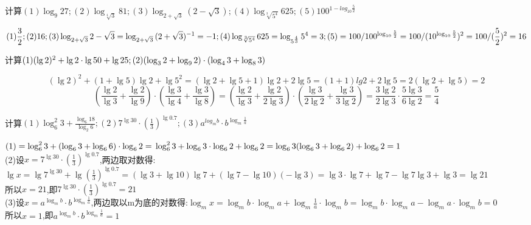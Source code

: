 \begin{problem}
    计算$\displaystyle (1)\log_9{27};(2)\log_{\sqrt[4]{3}}{81};
    (3)\log_{2+\sqrt{3}}{(2-\sqrt{3})};(4)\log_{\sqrt[3]{5^4}}{625};(5)100^{1-log_{10}{\frac{5}{2}}}$
    \begin{jiexi}
            $\displaystyle (1)\frac{3}{2};(2)16;(3)\log_{2+\sqrt{3}}{2-\sqrt{3}}=\log_{2+\sqrt{3}}{(2+\sqrt{3})^{-1}}=-1;
            \\ (4)\log_{\sqrt[3]{5^4}}{625}=\log_{5^{\frac{4}{3}}}{5^4}=3;
            (5)=100 / 100^{\log_{10}{\frac{5}{2}}}=100 / (10^{\log_{10}{\frac{5}{2}}})^2=100/(\frac{5}{2})^2=16$
    \end{jiexi}
\end{problem}

\begin{problem}
    计算$(1)(\lg2)^2+\lg2\cdot\lg{50}+\lg{25};\\
    (2)(\log_3{2}+\log_9{2})\cdot(\log_4{3}+\log_8{3})$
    \begin{jiexi}
        $$(\lg2)^2+(1+\lg5)\lg2+\lg{5^2}=(\lg2+\lg5+1)\lg2+2\lg5=(1+1)lg2+2\lg5=2(\lg2+\lg5) = 2$$
        $$(\frac{\lg2}{\lg3}+\frac{\lg2}{\lg9})\cdot(\frac{\lg3}{\lg4}+\frac{\lg3}{\lg8})=
        (\frac{\lg2}{\lg3}+\frac{\lg2}{2\lg3})\cdot(\frac{\lg3}{2\lg2}+\frac{\lg3}{3\lg2})=\frac{3\lg2}{2\lg3}\cdot\frac{5\lg3}{6\lg2}=\frac{5}{4}$$
    \end{jiexi}
\end{problem}

\begin{problem}
    计算$\displaystyle (1)\log_6^2{3}+\frac{\log_6{18}}{\log_2{6}};
    (2)7^{\lg{30}}\cdot (\frac{1}{3})^{\lg{0.7}};
    (3)a^{log_m{b}}\cdot b^{\log_m{\frac{1}{a}}}$
    \begin{jiexi}
        $(1)=\log_6^2{3}+(\log_6{3}+\log_6{6})\cdot\log_6{2}=\\ \log_6^2{3}+\log_6{3}
        \cdot\log_6{2}+\log_6{2}=\log_6{3}(\log_6{3}+\log_6{2})+\log_6{2}=1$
        \\ (2)设$\displaystyle x=7^{\lg{30}}\cdot (\frac{1}{3})^{\lg{0.7}}$,两边取对数得:
        $\displaystyle \lg{x}=\lg{7^{\lg{30}}}+\lg{(\frac{1}{3})^{\lg{0.7}}}=(\lg{3}+\lg{10})\lg{7}+(\lg{7}-\lg{10})(-\lg{3})=
        \lg3\cdot\lg7+\lg7-\lg7\lg3+\lg3=\lg{21}$\\
        所以$x=21$,即$\displaystyle 7^{\lg{30}}\cdot(\frac{1}{3})^{\lg{0.7}}=21$\\
        (3)设$x=a^{\log_m{b}}\cdot b^{\log_m{\frac{1}{a}}}$,两边取以m为底的对数得:$\log_m{x}=\log_m{b}\cdot \log_m{a}+\log_m{\frac{1}{a}}\cdot\log_m{b}=\log_m{b}\cdot\log_m{a}-\log_m{a}\cdot\log_m{b}=0$\\
        所以$x=1$,即$a^{\log_m{b}}\cdot b^{\log_m{\frac{1}{a}}}=1$
    \end{jiexi}
\end{problem}


